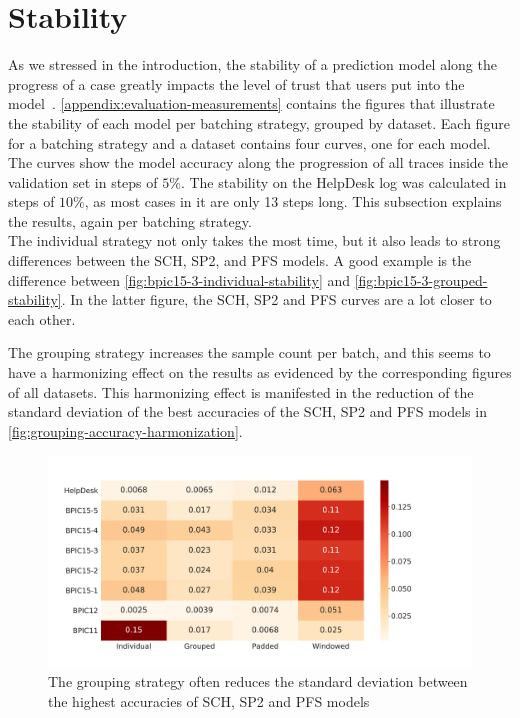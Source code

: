 \section{Stability}\label{sec:eval:stability}
As we stressed in the introduction, the stability of a prediction model along the progress of a case greatly impacts the level of trust that users put into the model~\cite{metzger2015}. \autoref{appendix:evaluation-measurements} contains the figures that illustrate the stability of each model per batching strategy, grouped by dataset. Each figure for a batching strategy and a dataset contains four curves, one for each model. The curves show the model accuracy along the progression of all traces inside the validation set in steps of $5\%$. The stability on the HelpDesk log was calculated in steps of $10\%$, as most cases in it are only 13 steps long. This subsection explains the results, again per batching strategy.\\

The individual strategy not only takes the most time, but it also leads to strong differences between the SCH, SP2, and PFS models. A good example is the difference between \autoref{fig:bpic15-3-individual-stability} and \autoref{fig:bpic15-3-grouped-stability}. In the latter figure, the SCH, SP2 and PFS curves are a lot closer to each other.

The grouping strategy increases the sample count per batch, and this seems to have a harmonizing effect on the results as evidenced by the corresponding figures of all datasets. This harmonizing effect is manifested in the reduction of the standard deviation of the best accuracies of the SCH, SP2 and PFS models in \autoref{fig:grouping-accuracy-harmonization}.

\begin{figure}
    \centering
    \includegraphics[width=\textwidth]{gfx/grouping-accuracy-harmonization.pdf}
    \caption[Batching strategy harmonizes top accuracies]{The grouping strategy often reduces the standard deviation between the highest accuracies of SCH, SP2 and PFS models}
    \label{fig:grouping-accuracy-harmonization}
\end{figure}


